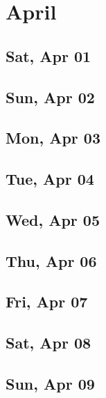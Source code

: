 \chapter{April}
	\section{Sat, Apr 01}
		
		
	\section{Sun, Apr 02}
		
		
	\section{Mon, Apr 03}
		
		
	\section{Tue, Apr 04}
		
		
	\section{Wed, Apr 05}
		
		
	\section{Thu, Apr 06}
		
		
	\section{Fri, Apr 07}
		
		
	\section{Sat, Apr 08}
		
		
	\section{Sun, Apr 09}
		
		
